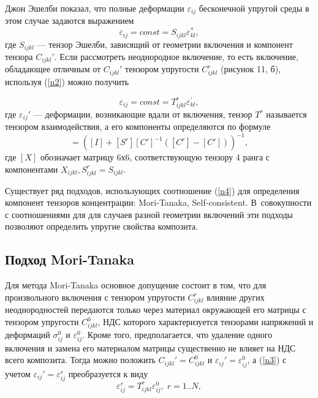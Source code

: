 \documentclass[12pt, a4paper]{article}
\begin{document}
Джон Эшелби показал, что полные деформации $\varepsilon_{ij}$ бесконечной упругой среды в этом случае задаются выражением 
\begin{equation}
	\varepsilon_{ij}=const=S_{ijkl}\varepsilon_{kl}^{*},
	\label{n2}
\end{equation}
где  $S_{ijkl}$ –-- тензор Эшелби, зависящий от геометрии включения и компонент тензора $C_{ijkl}'$. Если рассмотреть неоднородное включение, то есть включение, обладающее отличным от $C_{ijkl}'$ тензором упругости $C_{ijkl}^{r}$ (рисунок 11, б), используя (\ref{n2}) можно получить

\begin{equation}
	\varepsilon_{ij}=const=T_{ijkl}^{r}\varepsilon_{kl}^{'},
	\label{n3}
\end{equation}
где $\varepsilon_{ij}'$ --- деформации, возникающие вдали от включения, тензор $T^{r}$ называется тензором взаимодействия, а его компоненты определяются по формуле
\begin{equation}
	[T^r]=([I]+[S^r][C']^{-1}([C^r]-[C']))^{-1},
	\label{n4}
\end{equation}
где $[X]$ обозначает матрицу 6х6, соответствующую тензору 4 ранга с компонентами $X_{ijkl}, S_{ijkl}^r=S_{ijkl}$.

Существует ряд подходов, использующих соотношение (\ref{n4}) для определения компонент тензоров концентрации: Mori-Tanaka, Self-consistent. В совокупности с соотношениями для  для случаев разной геометрии включений эти подходы позволяют определить упругие свойства композита.

\subsection{Подход Mori-Tanaka}
Для метода Mori-Tanaka основное допущение состоит в том, что для произвольного включения с тензором упругости $C_{ijkl}^r$ влияние других неоднородностей передаются только через материал окружающей его матрицы с тензором упругости $C_{ijkl}^0$, НДС которого характеризуется тензорами напряжений и деформаций $\sigma_{ij}^0$ и $\varepsilon_{ij}^0$. Кроме того, предполагается, что удаление одного включения и замена его материалом матрицы существенно не влияет на НДС всего композита. Тогда можно положить $C_{ijkl}'=C_{ijkl}^0$ и $\varepsilon_{ij}'=\varepsilon_{ij}^0$, а (\ref{n3}) с учетом $\varepsilon_{ij}'=\varepsilon_{ij}^r$ преобразуется к виду 
\begin{equation}
	\varepsilon_{ij}^r=T_{ijkl}^r \varepsilon_{ij}^0, \; r=1..N,
	\label{n5}
\end{equation}
\end{document}
